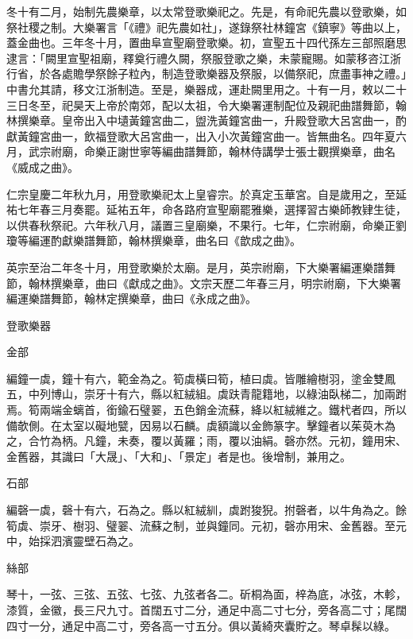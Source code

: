 \begin{pinyinscope}
 冬十有二月，始制先農樂章，以太常登歌樂祀之。先是，有命祀先農以登歌樂，如祭社稷之制。大樂署言「《禮》祀先農如社」，遂錄祭社林鐘宮《鎮寧》等曲以上，蓋金曲也。三年冬十月，置曲阜宣聖廟登歌樂。初，宣聖五十四代孫左三部照磨思逮言：「闕里宣聖祖廟，釋奠行禮久闕，祭服登歌之樂，未蒙寵賜。如蒙移咨江浙行省，於各處贍學祭餘子粒內，制造登歌樂器及祭服，以備祭祀，庶盡事神之禮。」中書允其請，移文江浙制造。至是，樂器成，運赴闕里用之。十有一月，敕以二十三日冬至，祀昊天上帝於南郊，配以太祖，令大樂署運制配位及親祀曲譜舞節，翰林撰樂章。皇帝出入中壝黃鐘宮曲二，盥洗黃鐘宮曲一，升殿登歌大呂宮曲一，酌獻黃鐘宮曲一，飲福登歌大呂宮曲一，出入小次黃鐘宮曲一。皆無曲名。四年夏六月，武宗祔廟，命樂正謝世寧等編曲譜舞節，翰林侍講學士張士觀撰樂章，曲名《威成之曲》。



 仁宗皇慶二年秋九月，用登歌樂祀太上皇睿宗。於真定玉華宮。自是歲用之，至延祐七年春三月奏罷。延祐五年，命各路府宣聖廟罷雅樂，選擇習古樂師教肄生徒，以供春秋祭祀。六年秋八月，議置三皇廟樂，不果行。七年，仁宗祔廟，命樂正劉瓊等編運酌獻樂譜舞節，翰林撰樂章，曲名曰《歆成之曲》。



 英宗至治二年冬十月，用登歌樂於太廟。是月，英宗祔廟，下大樂署編運樂譜舞節，翰林撰樂章，曲曰《獻成之曲》。文宗天歷二年春三月，明宗祔廟，下大樂署編運樂譜舞節，翰林定撰樂章，曲曰《永成之曲》。



 登歌樂器



 金部



 編鐘一虡，鐘十有六，範金為之。筍虡橫曰筍，植曰虡。皆雕繪樹羽，塗金雙鳳五，中列博山，崇牙十有六，縣以紅絨組。虡趺青龍籍地，以綠油臥梯二，加兩跗焉。筍兩端金螭首，銜鍮石璧翣，五色銷金流蘇，絳以紅絨維之。鐵杙者四，所以備欹側。在太室以礙地甓，因易以石麟。虡額識以金飾篆字。擊鐘者以茱萸木為之，合竹為柄。凡鐘，未奏，覆以黃羅；雨，覆以油絹。磬亦然。元初，鐘用宋、金舊器，其識曰「大晟」、「大和」、「景定」者是也。後增制，兼用之。



 石部



 編磬一虡，磬十有六，石為之。縣以紅絨紃，虡跗狻猊。拊磬者，以牛角為之。餘筍虡、崇牙、樹羽、璧翣、流蘇之制，並與鐘同。元初，磬亦用宋、金舊器。至元中，始採泗濱靈壁石為之。



 絲部



 琴十，一弦、三弦、五弦、七弦、九弦者各二。斫桐為面，梓為底，冰弦，木軫，漆質，金徽，長三尺九寸。首闊五寸二分，通足中高二寸七分，旁各高二寸；尾闊四寸一分，通足中高二寸，旁各高一寸五分。俱以黃綺夾囊貯之。琴卓髹以綠。




\end{pinyinscope}
